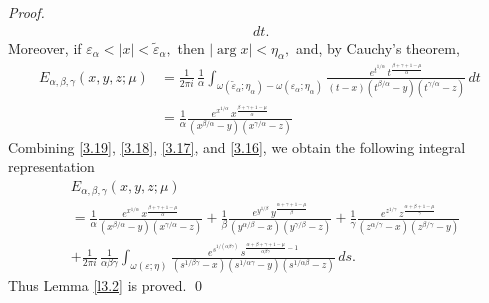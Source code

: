 \documentclass[12pt, reqno]{amsart}
\theoremstyle{definition}
\theoremstyle{remark}
\numberwithin{equation}{section}
\begin{document}
\begin{proof}
\begin{equation}
\begin{aligned}
{}
\,dt.\end{aligned}\end{equation}
Moreover, if
$
\varepsilon_\alpha<|x|<\widetilde{\varepsilon}_{\alpha},
$
then
$
|\arg x|<\eta_\alpha,
$
and, by Cauchy's theorem,
\begin{equation}\label{3.19}\begin{aligned}
E_{\alpha,\beta,\gamma}(x,y,z;\mu)
&=
\frac{1}{2\pi i}\,
\frac{1}{\alpha}
\int_{\omega(\widetilde{\varepsilon}_{\alpha};\eta_\alpha)-\omega(\varepsilon_{\alpha};\eta_\alpha)}
\frac{
e^{t^{1/\alpha}}
\,t^{\frac{\beta+\gamma+1-\mu}{\alpha}}
}
{
(t-x)(t^{\beta/\alpha}-y)(t^{\gamma/\alpha}-z)
}
\,dt\\
&=\frac{1}{\alpha}\frac{
e^{x^{1/\alpha}}
\,x^{\frac{\beta+\gamma+1-\mu}{\alpha}}}
{(x^{\beta/\alpha}-y)(x^{\gamma/\alpha}-z)}\end{aligned}
\end{equation}
Combining \eqref{3.19}, \eqref{3.18}, \eqref{3.17}, and \eqref{3.16}, we obtain
 the following integral representation 
\begin{equation}\label{3.20}\begin{aligned}
&E_{\alpha,\beta,\gamma}(x,y,z;\mu)\\
&=\frac{1}{\alpha}\frac{
e^{x^{1/\alpha}}
\,x^{\frac{\beta+\gamma+1-\mu}{\alpha}}}
{(x^{\beta/\alpha}-y)(x^{\gamma/\alpha}-z)}+\frac{1}{\beta}\frac{
e^{y^{1/\beta}}
\,y^{\frac{\alpha+\gamma+1-\mu}{\beta}}}
{(y^{\alpha/\beta}-x)(y^{\gamma/\beta}-z)}+\frac{1}{\gamma}\frac{
e^{z^{1/\gamma}}
\,z^{\frac{\alpha+\beta+1-\mu}{\gamma}}}
{(z^{\alpha/\gamma}-x)(z^{\beta/\gamma}-y)}\\
&+
\frac{1}{2\pi i}\,
\frac{1}{\alpha\beta\gamma}
\int_{\omega(\varepsilon;\eta)}
\frac{
e^{s^{1/(\alpha\beta\gamma)}}
\,s^{\frac{\alpha+\beta+\gamma+1-\mu}{\alpha\beta\gamma}-1}
}
{
(s^{1/\beta\gamma}-x)(s^{1/\alpha\gamma}-y)(s^{1/\alpha\beta}-z)
}
\,ds.\end{aligned}\end{equation}
Thus Lemma \ref{l3.2} is proved. \qed
\end{proof}
\end{document}
